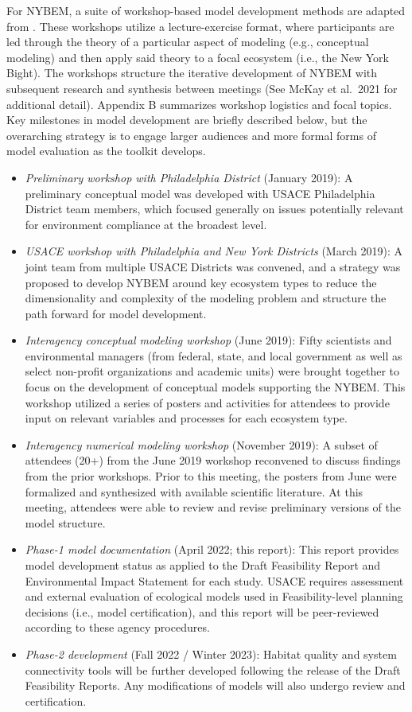 \documentclass[
]{book}
\begin{document}
For NYBEM, a suite of workshop-based model development methods are adapted from \citet{herman_unpacking_2019}. These workshops utilize a lecture-exercise format, where participants are led through the theory of a particular aspect of modeling (e.g., conceptual modeling) and then apply said theory to a focal ecosystem (i.e., the New York Bight). The workshops structure the iterative development of NYBEM with subsequent research and synthesis between meetings (See McKay et al.~2021 for additional detail). Appendix B summarizes workshop logistics and focal topics. Key milestones in model development are briefly described below, but the overarching strategy is to engage larger audiences and more formal forms of model evaluation as the toolkit develops.

\begin{itemize}
\item
  \emph{Preliminary workshop with Philadelphia District} (January 2019): A preliminary conceptual model was developed with USACE Philadelphia District team members, which focused generally on issues potentially relevant for environment compliance at the broadest level.
\item
  \emph{USACE workshop with Philadelphia and New York Districts} (March 2019): A joint team from multiple USACE Districts was convened, and a strategy was proposed to develop NYBEM around key ecosystem types to reduce the dimensionality and complexity of the modeling problem and structure the path forward for model development.
\item
  \emph{Interagency conceptual modeling workshop} (June 2019): Fifty scientists and environmental managers (from federal, state, and local government as well as select non-profit organizations and academic units) were brought together to focus on the development of conceptual models supporting the NYBEM. This workshop utilized a series of posters and activities for attendees to provide input on relevant variables and processes for each ecosystem type.
\item
  \emph{Interagency numerical modeling workshop} (November 2019): A subset of attendees (20+) from the June 2019 workshop reconvened to discuss findings from the prior workshops. Prior to this meeting, the posters from June were formalized and synthesized with available scientific literature. At this meeting, attendees were able to review and revise preliminary versions of the model structure.
\item
  \emph{Phase-1 model documentation} (April 2022; this report): This report provides model development status as applied to the Draft Feasibility Report and Environmental Impact Statement for each study. USACE requires assessment and external evaluation of ecological models used in Feasibility-level planning decisions (i.e., model certification), and this report will be peer-reviewed according to these agency procedures.
\item
  \emph{Phase-2 development} (Fall 2022 / Winter 2023): Habitat quality and system connectivity tools will be further developed following the release of the Draft Feasibility Reports. Any modifications of models will also undergo review and certification.
\end{itemize}
\end{document}
